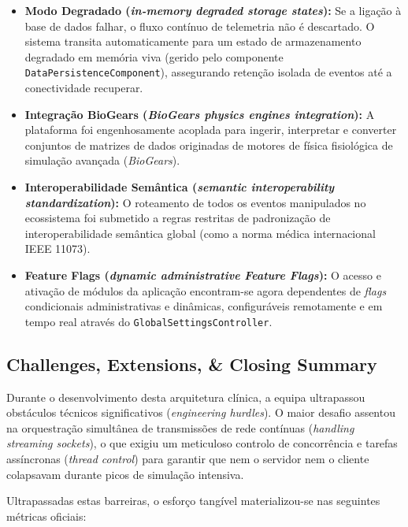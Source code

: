 \documentclass[11pt,a4paper]{article}
\begin{document}
\begin{itemize}[label=\color{accentblue}$\bullet$]
    \item \textbf{Modo Degradado (\textit{in-memory degraded storage states}):} Se a ligação à base de dados falhar, o fluxo contínuo de telemetria não é descartado. O sistema transita automaticamente para um estado de armazenamento degradado em memória viva (gerido pelo componente \texttt{DataPersistenceComponent}), assegurando retenção isolada de eventos até a conectividade recuperar.
    \item \textbf{Integração BioGears (\textit{BioGears physics engines integration}):} A plataforma foi engenhosamente acoplada para ingerir, interpretar e converter conjuntos de matrizes de dados originadas de motores de física fisiológica de simulação avançada (\textit{BioGears}).
    \item \textbf{Interoperabilidade Semântica (\textit{semantic interoperability standardization}):} O roteamento de todos os eventos manipulados no ecossistema foi submetido a regras restritas de padronização de interoperabilidade semântica global (como a norma médica internacional IEEE 11073).
    \item \textbf{Feature Flags (\textit{dynamic administrative Feature Flags}):} O acesso e ativação de módulos da aplicação encontram-se agora dependentes de \textit{flags} condicionais administrativas e dinâmicas, configuráveis remotamente e em tempo real através do \texttt{GlobalSettingsController}.
\end{itemize}

\subsection{Challenges, Extensions, \& Closing Summary}
Durante o desenvolvimento desta arquitetura clínica, a equipa ultrapassou obstáculos técnicos significativos (\textit{engineering hurdles}). O maior desafio assentou na orquestração simultânea de transmissões de rede contínuas (\textit{handling streaming sockets}), o que exigiu um meticuloso controlo de concorrência e tarefas assíncronas (\textit{thread control}) para garantir que nem o servidor nem o cliente colapsavam durante picos de simulação intensiva.

Ultrapassadas estas barreiras, o esforço tangível materializou-se nas seguintes métricas oficiais:
\end{document}

